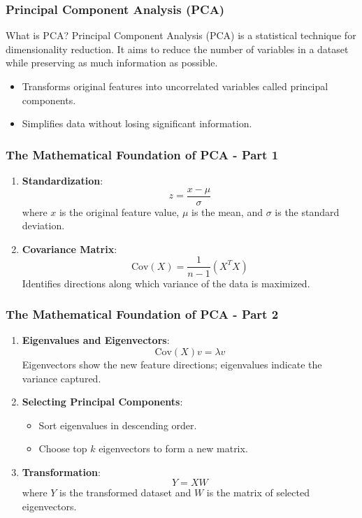 \documentclass[aspectratio=169]{beamer}
\begin{document}
\begin{frame}[fragile]
    \frametitle{Principal Component Analysis (PCA)}
    \begin{block}{What is PCA?}
        Principal Component Analysis (PCA) is a statistical technique for dimensionality reduction. It aims to reduce the number of variables in a dataset while preserving as much information as possible.
    \end{block}
    \begin{itemize}
        \item Transforms original features into uncorrelated variables called principal components.
        \item Simplifies data without losing significant information.
    \end{itemize}
\end{frame}

\begin{frame}[fragile]
    \frametitle{The Mathematical Foundation of PCA - Part 1}
    \begin{enumerate}
        \item \textbf{Standardization}:
            \[
            z = \frac{x - \mu}{\sigma}
            \]
            where \( x \) is the original feature value, \( \mu \) is the mean, and \( \sigma \) is the standard deviation.
        
        \item \textbf{Covariance Matrix}:
            \[
            \text{Cov}(X) = \frac{1}{n-1} (X^T X)
            \]
            Identifies directions along which variance of the data is maximized.
    \end{enumerate}
\end{frame}

\begin{frame}[fragile]
    \frametitle{The Mathematical Foundation of PCA - Part 2}
    \begin{enumerate}[resume]
        \item \textbf{Eigenvalues and Eigenvectors}:
            \[
            \text{Cov}(X)v = \lambda v
            \]
            Eigenvectors show the new feature directions; eigenvalues indicate the variance captured.
        
        \item \textbf{Selecting Principal Components}:
            \begin{itemize}
                \item Sort eigenvalues in descending order.
                \item Choose top \( k \) eigenvectors to form a new matrix.
            \end{itemize}
        
        \item \textbf{Transformation}:
            \[
            Y = XW
            \]
            where \( Y \) is the transformed dataset and \( W \) is the matrix of selected eigenvectors.
    \end{enumerate}
\end{frame}
\end{document}
